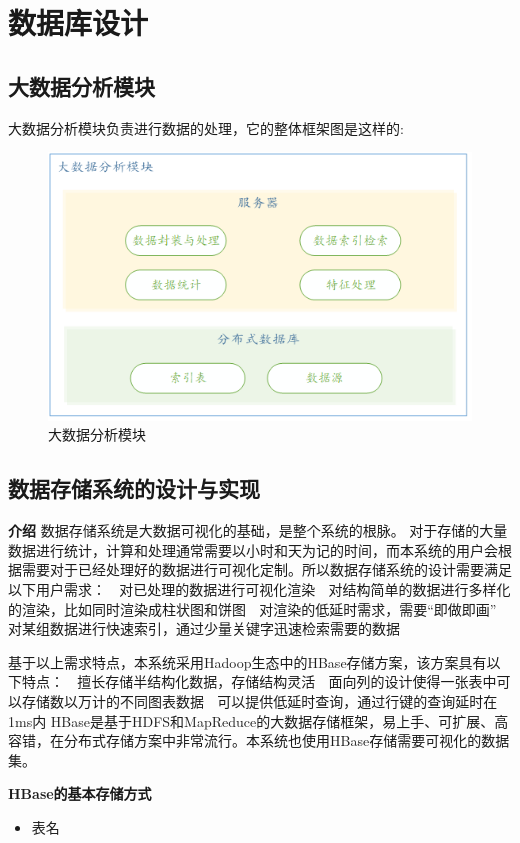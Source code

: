 \section{数据库设计}

\subsection{大数据分析模块}
大数据分析模块负责进行数据的处理，它的整体框架图是这样的:
\begin{figure}[!htbp]
	\centering
	\includegraphics[scale=0.4]{image/d1.png}
	\caption{大数据分析模块}
\end{figure}

\subsection{数据存储系统的设计与实现}
\textbf{介绍}
数据存储系统是大数据可视化的基础，是整个系统的根脉。
对于存储的大量数据进行统计，计算和处理通常需要以小时和天为记的时间，而本系统的用户会根据需要对于已经处理好的数据进行可视化定制。所以数据存储系统的设计需要满足以下用户需求：
	对已处理的数据进行可视化渲染
	对结构简单的数据进行多样化的渲染，比如同时渲染成柱状图和饼图
	对渲染的低延时需求，需要“即做即画”
	对某组数据进行快速索引，通过少量关键字迅速检索需要的数据

基于以上需求特点，本系统采用Hadoop生态中的HBase存储方案，该方案具有以下特点：
	擅长存储半结构化数据，存储结构灵活
	面向列的设计使得一张表中可以存储数以万计的不同图表数据
	可以提供低延时查询，通过行键的查询延时在1ms内
HBase是基于HDFS和MapReduce的大数据存储框架，易上手、可扩展、高容错，在分布式存储方案中非常流行。本系统也使用HBase存储需要可视化的数据集。

\textbf{HBase的基本存储方式}
\begin{itemize}
\item 表名
\end{itemize}

